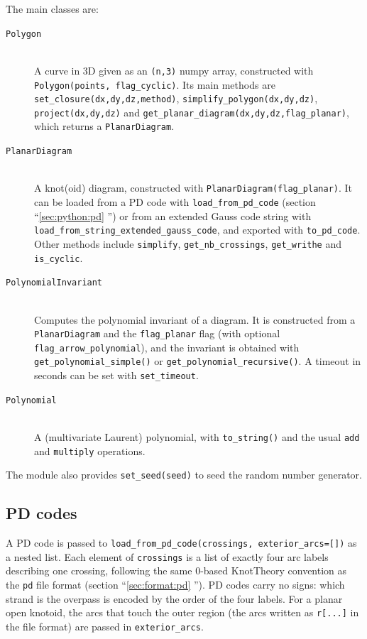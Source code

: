 The main classes are:
\begin{description}
\item[\lstinline{Polygon}]\hfill\\
  A curve in 3D given as an \lstinline{(n,3)} {\ttfamily numpy} array, constructed with \lstinline{Polygon(points, flag_cyclic)}. Its main methods are \lstinline{set_closure(dx,dy,dz,method)}, \lstinline{simplify_polygon(dx,dy,dz)}, \lstinline{project(dx,dy,dz)} and \lstinline{get_planar_diagram(dx,dy,dz,flag_planar)}, which returns a \lstinline{PlanarDiagram}.
\item[\lstinline{PlanarDiagram}]\hfill\\
  A knot(oid) diagram, constructed with \lstinline{PlanarDiagram(flag_planar)}. It can be loaded from a PD code with \lstinline{load_from_pd_code} (section ``\ref{sec:python:pd} '') or from an extended Gauss code string with \lstinline{load_from_string_extended_gauss_code}, and exported with \lstinline{to_pd_code}. Other methods include \lstinline{simplify}, \lstinline{get_nb_crossings}, \lstinline{get_writhe} and \lstinline{is_cyclic}.
\item[\lstinline{PolynomialInvariant}]\hfill\\
  Computes the polynomial invariant of a diagram. It is constructed from a \lstinline{PlanarDiagram} and the \lstinline{flag_planar} flag (with optional \lstinline{flag_arrow_polynomial}), and the invariant is obtained with \lstinline{get_polynomial_simple()} or \lstinline{get_polynomial_recursive()}. A timeout in seconds can be set with \lstinline{set_timeout}.
\item[\lstinline{Polynomial}]\hfill\\
  A (multivariate Laurent) polynomial, with \lstinline{to_string()} and the usual \lstinline{add} and \lstinline{multiply} operations.
\end{description}
The module also provides \lstinline{set_seed(seed)} to seed the random number generator.

\subsection{\label{sec:python:pd}PD codes}
A PD code is passed to \lstinline{load_from_pd_code(crossings, exterior_arcs=[])} as a nested list. Each element of \lstinline{crossings} is a list of exactly four arc labels describing one crossing, following the same 0-based KnotTheory convention as the \lstinline{pd} file format (section ``\ref{sec:format:pd} ''). PD codes carry no signs: which strand is the overpass is encoded by the order of the four labels. For a planar open knotoid, the arcs that touch the outer region (the arcs written as \lstinline{r[...]} in the file format) are passed in \lstinline{exterior_arcs}.

